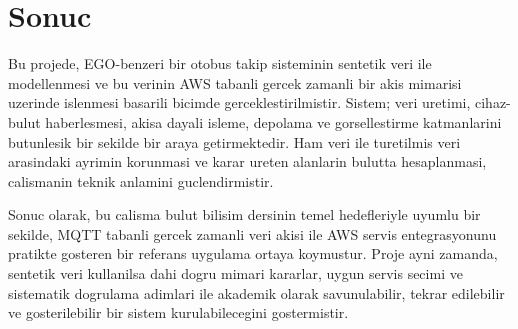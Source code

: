 \section{Sonuc}

Bu projede, EGO-benzeri bir otobus takip sisteminin sentetik veri ile modellenmesi ve bu verinin AWS tabanli gercek zamanli bir akis mimarisi uzerinde islenmesi basarili bicimde gerceklestirilmistir. Sistem; veri uretimi, cihaz-bulut haberlesmesi, akisa dayali isleme, depolama ve gorsellestirme katmanlarini butunlesik bir sekilde bir araya getirmektedir. Ham veri ile turetilmis veri arasindaki ayrimin korunmasi ve karar ureten alanlarin bulutta hesaplanmasi, calismanin teknik anlamini guclendirmistir.

Sonuc olarak, bu calisma bulut bilisim dersinin temel hedefleriyle uyumlu bir sekilde, MQTT tabanli gercek zamanli veri akisi ile AWS servis entegrasyonunu pratikte gosteren bir referans uygulama ortaya koymustur. Proje ayni zamanda, sentetik veri kullanilsa dahi dogru mimari kararlar, uygun servis secimi ve sistematik dogrulama adimlari ile akademik olarak savunulabilir, tekrar edilebilir ve gosterilebilir bir sistem kurulabilecegini gostermistir.
